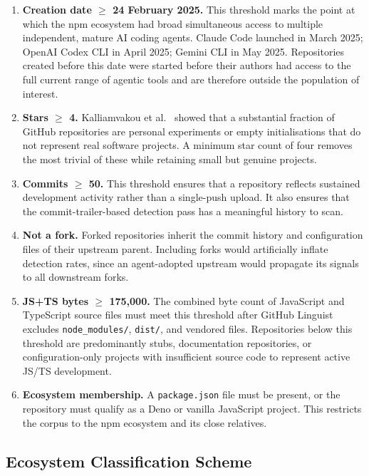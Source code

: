 \begin{enumerate}
  \item \textbf{Creation date $\geq$ 24 February 2025.} This threshold marks the point at which the npm ecosystem had broad simultaneous access to multiple independent, mature AI coding agents. Claude Code launched in March 2025; OpenAI Codex CLI in April 2025; Gemini CLI in May 2025. Repositories created before this date were started before their authors had access to the full current range of agentic tools and are therefore outside the population of interest.

  \item \textbf{Stars $\geq$ 4.} Kalliamvakou et al.~\cite{kalliamvakou2016} showed that a substantial fraction of GitHub repositories are personal experiments or empty initialisations that do not represent real software projects. A minimum star count of four removes the most trivial of these while retaining small but genuine projects.

  \item \textbf{Commits $\geq$ 50.} This threshold ensures that a repository reflects sustained development activity rather than a single-push upload. It also ensures that the commit-trailer-based detection pass has a meaningful history to scan.

  \item \textbf{Not a fork.} Forked repositories inherit the commit history and configuration files of their upstream parent. Including forks would artificially inflate detection rates, since an agent-adopted upstream would propagate its signals to all downstream forks.

  \item \textbf{JS+TS bytes $\geq$ 175,000.} The combined byte count of JavaScript and TypeScript source files must meet this threshold after GitHub Linguist excludes \texttt{node\_modules/}, \texttt{dist/}, and vendored files. Repositories below this threshold are predominantly stubs, documentation repositories, or configuration-only projects with insufficient source code to represent active JS/TS development.

  \item \textbf{Ecosystem membership.} A \texttt{package.json} file must be present, or the repository must qualify as a Deno or vanilla JavaScript project. This restricts the corpus to the npm ecosystem and its close relatives.
\end{enumerate}

\subsection{Ecosystem Classification Scheme}

